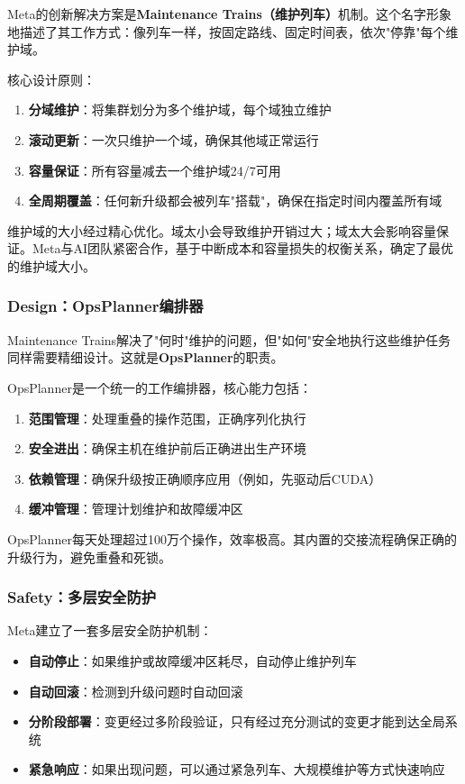 Meta的创新解决方案是\textbf{Maintenance Trains（维护列车）}机制。这个名字形象地描述了其工作方式：像列车一样，按固定路线、固定时间表，依次"停靠"每个维护域。

核心设计原则：

\begin{enumerate}
    \item \textbf{分域维护}：将集群划分为多个维护域，每个域独立维护
    \item \textbf{滚动更新}：一次只维护一个域，确保其他域正常运行
    \item \textbf{容量保证}：所有容量减去一个维护域24/7可用
    \item \textbf{全周期覆盖}：任何新升级都会被列车"搭载"，确保在指定时间内覆盖所有域
\end{enumerate}

维护域的大小经过精心优化。域太小会导致维护开销过大；域太大会影响容量保证。Meta与AI团队紧密合作，基于中断成本和容量损失的权衡关系，确定了最优的维护域大小。

\subsubsection{Design：OpsPlanner编排器}

Maintenance Trains解决了"何时"维护的问题，但"如何"安全地执行这些维护任务同样需要精细设计。这就是\textbf{OpsPlanner}的职责。

OpsPlanner是一个统一的工作编排器，核心能力包括：

\begin{enumerate}
    \item \textbf{范围管理}：处理重叠的操作范围，正确序列化执行
    \item \textbf{安全进出}：确保主机在维护前后正确进出生产环境
    \item \textbf{依赖管理}：确保升级按正确顺序应用（例如，先驱动后CUDA）
    \item \textbf{缓冲管理}：管理计划维护和故障缓冲区
\end{enumerate}

OpsPlanner每天处理超过100万个操作，效率极高。其内置的交接流程确保正确的升级行为，避免重叠和死锁。

\subsubsection{Safety：多层安全防护}

Meta建立了一套多层安全防护机制：

\begin{itemize}
    \item \textbf{自动停止}：如果维护或故障缓冲区耗尽，自动停止维护列车
    \item \textbf{自动回滚}：检测到升级问题时自动回滚
    \item \textbf{分阶段部署}：变更经过多阶段验证，只有经过充分测试的变更才能到达全局系统
    \item \textbf{紧急响应}：如果出现问题，可以通过紧急列车、大规模维护等方式快速响应
\end{itemize}

